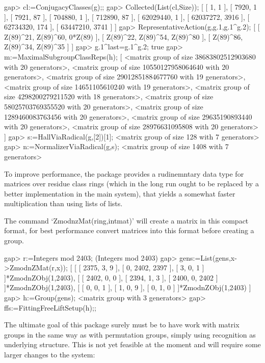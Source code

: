 \beginexample
gap> cl:=ConjugacyClasses(g);;
gap> Collected(List(cl,Size));
[ [ 1, 1 ], [ 7920, 1 ], [ 7921, 87 ], [ 704880, 1 ], [ 712890, 87 ], 
  [ 62029440, 1 ], [ 62037272, 3916 ], [ 62734320, 174 ], [ 63447210, 3741 ] ]
gap> RepresentativeAction(g,g.1,g.1^g.2);               
[ [ Z(89)^21, Z(89)^60, 0*Z(89) ], [ Z(89)^22, Z(89)^54, Z(89)^80 ], 
  [ Z(89)^86, Z(89)^34, Z(89)^35 ] ]
gap> g.1^last=g.1^g.2; 
true
gap> m:=MaximalSubgroupClassReps(h);
[ <matrix group of size 38683802512903680 with 20 generators>, 
  <matrix group of size 10550127958064640 with 20 generators>, 
  <matrix group of size 29012851884677760 with 19 generators>, 
  <matrix group of size 14651105610240 with 19 generators>, 
  <matrix group of size 4298200279211520 with 18 generators>, 
  <matrix group of size 58025703769355520 with 20 generators>, 
  <matrix group of size 1289460083763456 with 20 generators>, 
  <matrix group of size 29635190893440 with 20 generators>, 
  <matrix group of size 28976631095808 with 20 generators> ]
gap> s:=HallViaRadical(g,[2])[1];
<matrix group of size 128 with 7 generators>
gap> n:=NormalizerViaRadical(g,s);
<matrix group of size 1408 with 7 generators>
\endexample


To improve performance, the package provides a rudinemntary data type for
matrices over residue class rings (which in the long run ought to be replaced
by a better implementation in the main system), that yields a somewhat faster
multiplication than using lists of lists.

The command `ZmodnzMat(ring,intmat)' will create a matrix in this compact
format, for best performance convert matrices into this format before
creating a group.

\beginexample
gap> r:=Integers mod 2403;
(Integers mod 2403)
gap> gens:=List(gens,x->ZmodnZMat(r,x));
[ [ [ 2375, 3, 9 ], [ 0, 2402, 2397 ], [ 3, 0, 1 ] ]*ZmodnZObj(1,2403),
  [ [ 2402, 0, 0 ], [ 2394, 1, 3 ], [ 2400, 0, 2402 ] ]*ZmodnZObj(1,2403),
  [ [ 0, 0, 1 ], [ 1, 0, 9 ], [ 0, 1, 0 ] ]*ZmodnZObj(1,2403) ]
gap> h:=Group(gens);
<matrix group with 3 generators>
gap> ffs:=FittingFreeLiftSetup(h);;
\endexample


The ultimate goal of this package surely must be to have {\GAP} work with
matrix groups in the same way as with permutation groups, simply using
recognition as underlying structure. This is not yet feasible at the moment
and will require some larger changes to the system:

